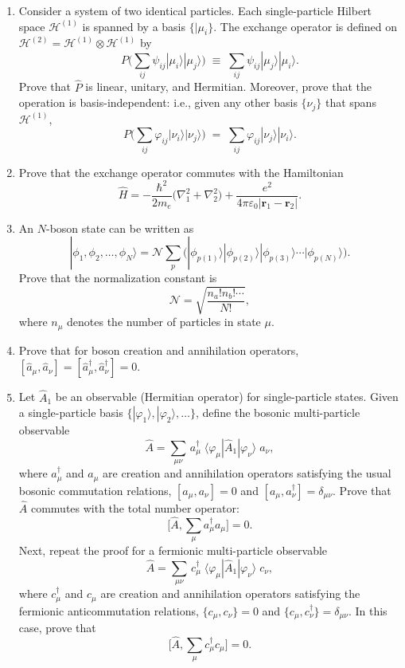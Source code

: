 \documentclass[pra,12pt]{revtex4}
\begin{document}
\begin{enumerate}
\item Consider a system of two identical particles.  Each
  single-particle Hilbert space $\mathscr{H}^{(1)}$ is spanned by a
  basis $\{|\mu_i\}$.  The exchange operator is defined on
  $\mathscr{H}^{(2)} = \mathscr{H}^{(1)} \otimes \mathscr{H}^{(1)}$ by
$$P \Big (\sum_{ij} \psi_{ij} |\mu_i\rangle|\mu_j\rangle \Big)
  \;\equiv\;  \sum_{ij} \psi_{ij} |\mu_j\rangle|\mu_i\rangle.$$
  Prove that $\hat{P}$ is linear, unitary, and Hermitian.  Moreover,
  prove that the operation is basis-independent: i.e., given any other
  basis $\{\nu_j\}$ that spans $\mathscr{H}^{(1)}$,
$$P \Big (\sum_{ij} \varphi_{ij} |\nu_i\rangle|\nu_j\rangle \Big)
  \;=\;  \sum_{ij} \varphi_{ij} |\nu_j\rangle|\nu_i\rangle.$$
  \label{ex:1}

\item
  Prove that the exchange operator commutes with the Hamiltonian
$$\hat{H} = - \frac{\hbar^2}{2m_e} \Big(\nabla_1^2 + \nabla^2_2\Big) + \frac{e^2}{4\pi\varepsilon_0|\mathbf{r}_1 - \mathbf{r}_2|}.$$ \label{ex:2}

\item
  An $N$-boson state can be written as
$$|\phi_1,\phi_2,\dots,\phi_N\rangle = \mathcal{N} \sum_p \Big(|\phi_{p(1)}\rangle  |\phi_{p(2)}\rangle  |\phi_{p(3)}\rangle  \cdots  |\phi_{p(N)}\rangle\Big).$$
  Prove that the normalization constant is
$$\mathcal{N} = \sqrt{\frac{n_a!n_b!\cdots}{N!}},$$
  where $n_\mu$ denotes the number of particles in state $\mu$.
  \label{ex:boson_norm}

\item
  Prove that for boson creation and annihilation operators, $[\hat{a}_\mu,\hat{a}_\nu] = [\hat{a}_\mu^\dagger,\hat{a}_\nu^\dagger] = 0$.
  \label{ex:boson_commutators}

\item
  Let $\hat{A}_1$ be an observable (Hermitian operator) for
  single-particle states.  Given a single-particle basis
  $\{|\varphi_1\rangle,|\varphi_2\rangle,\dots\}$, define the
  bosonic multi-particle observable
  $$\hat{A} = \sum_{\mu\nu} \,a^\dagger_\mu \; \langle\varphi_\mu|\hat{A}_1|\varphi_\nu\rangle \; a_\nu,$$
  where $a_\mu^\dagger$ and $a_\mu$ are creation and annihilation
  operators satisfying the usual bosonic commutation relations,
  $[a_\mu,a_\nu] = 0$ and $[a_\mu,a_\nu^\dagger] = \delta_{\mu\nu}$.
  Prove that $\hat{A}$ commutes with the total number operator:
  $$\Big[\hat{A}, \sum_\mu a^\dagger_\mu a_\mu \Big] = 0.$$
  Next, repeat the proof for a fermionic multi-particle observable
  $$\hat{A} = \sum_{\mu\nu} \,c^\dagger_\mu \; \langle\varphi_\mu|\hat{A}_1|\varphi_\nu\rangle \; c_\nu,$$
  where $c_\mu^\dagger$ and $c_\mu$ are creation and annihilation
  operators satisfying the fermionic anticommutation relations,
  $\{c_\mu,c_\nu\} = 0$ and $\{c_\mu,c_\nu^\dagger\} = \delta_{\mu\nu}$.
  In this case, prove that
  $$\Big[\hat{A}, \sum_\mu c^\dagger_\mu c_\mu \Big] = 0.$$
  \label{ex:n_conserved}

\end{enumerate}
\end{document}
